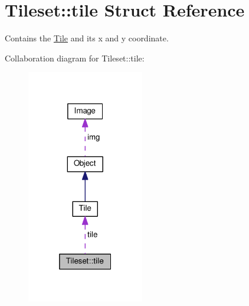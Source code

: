 \hypertarget{structTileset_1_1tile}{}\section{Tileset\+:\+:tile Struct Reference}
\label{structTileset_1_1tile}


Contains the \hyperlink{classTile}{Tile} and its x and y coordinate.  




Collaboration diagram for Tileset\+:\+:tile\+:\nopagebreak
\begin{figure}[H]
\begin{center}
\leavevmode
\includegraphics[width=145pt]{structTileset_1_1tile__coll__graph}
\end{center}
\end{figure}
